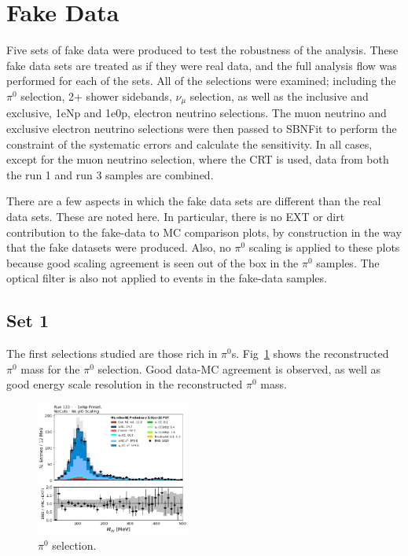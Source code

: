 \section{Fake Data}{}
\label{sec:fakedata}

Five sets of fake data were produced to test the robustness of the analysis.  These fake data sets are treated as if they were real data, and the full analysis flow was performed for each of the sets. All of the selections were examined; including the $\pi^{0}$ selection, 2+ shower sidebands, $\nu_{\mu}$ selection, as well as the inclusive and exclusive, 1eNp and 1e0p, electron neutrino selections.  The muon neutrino and exclusive electron neutrino selections were then passed to SBNFit to perform the constraint of the systematic errors and calculate the sensitivity.  In all cases, except for the muon neutrino selection, where the CRT is used, data from both the run 1 and run 3 samples are combined.

There are a few aspects in which the fake data sets are different than the real data sets. These are noted here.  In particular, there is no EXT or dirt contribution to the fake-data to MC comparison plots, by construction in the way that the fake datasets were produced.  Also, no $\pi^{0}$ scaling is applied to these plots because good scaling agreement is seen out of the box in the $\pi^{0}$ samples. The optical filter is also not applied to events in the fake-data samples.

\subsection{Set 1}

The first selections studied are those rich in $\pi^{0}$s. Fig~\ref{fig:fakedata:set1:pi0} shows the reconstructed $\pi^{0}$ mass for the $\pi^{0}$ selection. Good data-MC agreement is observed, as well as good energy scale resolution in the reconstructed $\pi^{0}$ mass. 
\begin{figure}[H]
\begin{center}
\includegraphics[width=0.45\textwidth]{Fakedata/set1/pi0.pdf}
\caption{\label{fig:fakedata:set1:pi0} $\pi^{0}$ selection.}
\end{center}
\end{figure}

